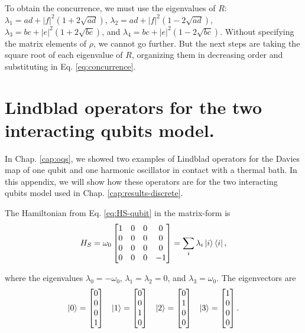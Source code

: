 \begin{apendicesenv}
\noindent To obtain the concurrence, we must use the eigenvalues of $R$: $\lambda_1 = ad+|f|^2 (1 + 2\sqrt{ad})$, $\lambda_2 = ad+|f|^2 (1 - 2\sqrt{ad})$, $\lambda_3 =  bc+|e|^2(1 + 2\sqrt{bc})$, and $\lambda_4 =  bc+|e|^2(1 - 2\sqrt{bc})$. Without specifying the matrix elements of $\rho$, we cannot go further. But the next steps are taking the square root of each eigenvalue of $R$, organizing them in decreasing order and substituting in Eq. \eqref{eq:concurrence}.






\chapter{Lindblad operators for the two interacting qubits model.}
\label{apx:lindblad-qubits}

In Chap. \ref{cap:oqs}, we showed two examples of Lindblad operators for the Davies map of one qubit and one harmonic oscillator in contact with a thermal bath. In this appendix, we will show how these operators are for the two interacting qubits model used in Chap. \ref{cap:results-discrete}.

The Hamiltonian from Eq. \eqref{eq:HS-qubit} in the matrix-form is
\begin{equation}
	H_S = \omega_0 \begin{bmatrix}
        1& 0& 0& 0 \\
        0& 0& 0& 0\\
        0& 0& 0& 0\\
        0& 0& 0& -1
    \end{bmatrix}
    = \sum_i \lambda_i \ket{i}\bra{i},
\end{equation}

\noindent where the eigenvalues $\lambda_0 = -\omega_0$, $\lambda_1 = \lambda_2 = 0$, and $\lambda_3 = \omega_0$. The eigenvectors are
\begin{equation}
\begin{array}{cccc}
	\ket{0} = \begin{bmatrix}
		0\\
		0\\
		0\\
		1
	\end{bmatrix}
	&
	\ket{1} = \begin{bmatrix}
		0\\
		0\\
		1\\
		0
	\end{bmatrix}
	&
	\ket{2} = \begin{bmatrix}
		0\\
		1\\
		0\\
		0
	\end{bmatrix}
	&
	\ket{3} = \begin{bmatrix}
		1\\
		0\\
		0\\
		0
	\end{bmatrix}.
\end{array}
\end{equation}


\end{apendicesenv}
